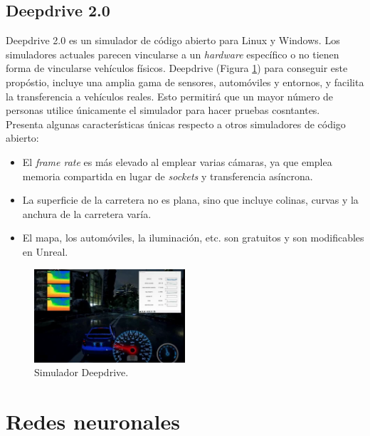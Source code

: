 \subsection{Deepdrive 2.0}

Deepdrive 2.0 \cite{deepdrive} es un simulador de código abierto para Linux y Windows. Los simuladores actuales parecen vincularse a un \textit{hardware} específico o no tienen forma de vincularse vehículos físicos. Deepdrive (Figura \ref{fig.deepdrive}) para conseguir este propóstio, incluye una amplia gama de sensores, automóviles y entornos, y facilita la transferencia a vehículos reales. Esto permitirá que un mayor número de personas utilice únicamente el simulador para hacer pruebas cosntantes.\\

Presenta algunas características únicas respecto a otros simuladores de código abierto:

\begin{itemize}
\item El \textit{frame rate} es más elevado al emplear varias cámaras, ya que emplea memoria compartida en lugar de \textit{sockets} y transferencia asíncrona.
\item La superficie de la carretera no es plana, sino que incluye colinas, curvas y la anchura de la carretera varía.
\item El mapa, los automóviles, la iluminación, etc. son gratuitos y son modificables en Unreal.
\end{itemize}

\begin{figure}
\begin{center}
	\includegraphics[width=0.5\textwidth]{figures/Estado_arte/deepdrive.png}
   \caption{Simulador Deepdrive.}
	\label{fig.deepdrive}
\end{center}
\end{figure}


\section{Redes neuronales}

